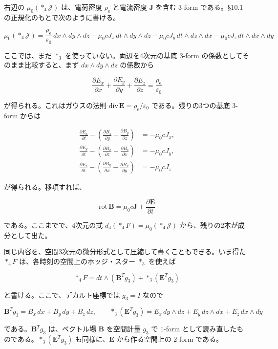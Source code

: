 \documentclass[a4paper,12pt,openany]{book}
\begin{document}
右辺の \(\mu_0(\ast_4\mathcal{J})\) は、電荷密度 \(\rho_{\mathrm e}\)
と電流密度 \(\mathbf{J}\) を含む \(3\)-form である。§10.1
の正規化のもとで次のように書ける。

\[
\mu_0(\ast_4\mathcal{J}) = \frac{\rho_{\mathrm e}}{\varepsilon_0}\,dx\wedge dy\wedge dz - \mu_0 c J_x\,dt\wedge dy\wedge dz - \mu_0 c J_y\,dt\wedge dz\wedge dx - \mu_0 c J_z\,dt\wedge dx\wedge dy
\]

ここでは、まだ \(\ast_3\) を使っていない。両辺を4次元の基底 \(3\)-form
の係数としてそのまま比較すると、まず \(dx\wedge dy\wedge dz\) の係数から

\[
\frac{\partial E_x}{\partial x}+\frac{\partial E_y}{\partial y}+\frac{\partial E_z}{\partial z}=\frac{\rho_{\mathrm e}}{\varepsilon_0}
\]

が得られる。これはガウスの法則
\(\mathrm{div}\,\mathbf E=\rho_{\mathrm e}/\varepsilon_0\)
である。残りの3つの基底 \(3\)-form からは

\[
\begin{aligned}
\frac{\partial E_x}{\partial t}-\left(\frac{\partial B_z}{\partial y}-\frac{\partial B_y}{\partial z}\right)&=-\mu_0 cJ_x,\\
\frac{\partial E_y}{\partial t}-\left(\frac{\partial B_x}{\partial z}-\frac{\partial B_z}{\partial x}\right)&=-\mu_0 cJ_y,\\
\frac{\partial E_z}{\partial t}-\left(\frac{\partial B_y}{\partial x}-\frac{\partial B_x}{\partial y}\right)&=-\mu_0 cJ_z
\end{aligned}
\]

が得られる。移項すれば、

\[
\mathrm{rot}\,\mathbf{B} = \mu_0 c \mathbf{J} + \frac{\partial \mathbf{E}}{\partial t}
\]

である。ここまでで、4次元の式 \(d_4(\ast_4F)=\mu_0(\ast_4\mathcal{J})\)
から、残りの2本が成分として出た。

同じ内容を、空間3次元の微分形式として圧縮して書くこともできる。いま得た
\(\ast_4F\) は、各時刻の空間上のホッジ・スター \(\ast_3\) を使えば

\[
\ast_4F=dt\wedge(\mathbf{B}^T g_3)+\ast_3(\mathbf{E}^T g_3)
\]

と書ける。ここで、デカルト座標では \(g_3=I\) なので

\[
\mathbf{B}^T g_3
=
B_x\,dx+B_y\,dy+B_z\,dz,
\qquad
\ast_3(\mathbf{E}^T g_3)
=
E_x\,dy\wedge dz+E_y\,dz\wedge dx+E_z\,dx\wedge dy
\]

である。\(\mathbf{B}^T g_3\) は、ベクトル場 \(\mathbf{B}\) を空間計量
\(g_3\) で \(1\)-form
として読み直したものである。\(\ast_3(\mathbf{E}^T g_3)\)
も同様に、\(\mathbf{E}\) から作る空間上の \(2\)-form である。
\end{document}

